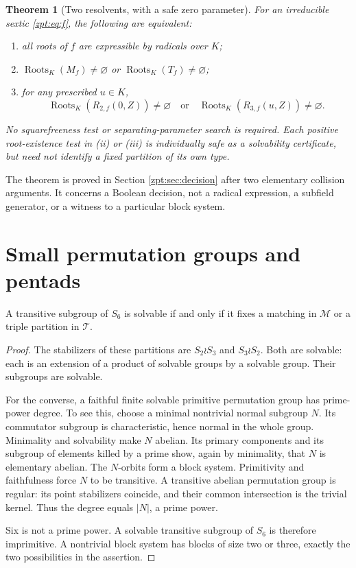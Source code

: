 \documentclass[11pt,letterpaper]{article}
\numberwithin{equation}{section}
\newtheorem{theorem}{Theorem}[section]
\theoremstyle{definition}
\theoremstyle{remark}
\newcommand{\Rtwo}{R_{2,f}}
\newcommand{\Rthree}{R_{3,f}}
\newcommand{\tpoM}{\mathcal M}
\newcommand{\tpoT}{\mathcal T}
\DeclareMathOperator{\Roots}{Roots}
\newcommand{\Ares}{M_f}\newcommand{\Tres}{T_f}
\newcommand{\roots}[1]{\Roots_K(#1)}
\begin{document}
\begin{theorem}[Two resolvents, with a safe zero parameter]
\label{zpt:thm:main}
For an irreducible sextic \eqref{zpt:eq:f}, the following are equivalent:
\begin{enumerate}[label=\textup{(\roman*)},itemsep=1pt]
\item all roots of $f$ are expressible by radicals over $K$;
\item $\roots{\Ares}\ne\varnothing$ or $\roots{\Tres}\ne\varnothing$;
\item for any prescribed $u\in K$,
\[
 \roots{\Rtwo(0,Z)}\ne\varnothing
 \quad\text{or}\quad
 \roots{\Rthree(u,Z)}\ne\varnothing.
\]
\end{enumerate}
No squarefreeness test or separating-parameter search is required.
Each positive root-existence test in (ii) or (iii) is individually safe as a
solvability certificate, but need not identify a fixed partition of its own
type.
\end{theorem}

The theorem is proved in Section \ref{zpt:sec:decision} after two elementary
collision arguments. It concerns a Boolean decision, not a radical
expression, a subfield generator, or a witness to a particular block system.

\section{Small permutation groups and pentads}
\label{zpt:sec:groups}
\begin{lemma}
\label{zpt:lem:block}
A transitive subgroup of $S_6$ is solvable if and only if it fixes a matching
in $\tpoM$ or a triple partition in $\tpoT$.
\end{lemma}
\begin{proof}
The stabilizers of these partitions are $S_2\wr S_3$ and $S_3\wr S_2$.
Both are solvable: each is an extension of a product of solvable groups by
a solvable group. Their subgroups are solvable.

For the converse, a faithful finite solvable primitive permutation group
has prime-power degree. To see this, choose a minimal nontrivial normal
subgroup $N$. Its commutator subgroup is characteristic, hence normal in
the whole group. Minimality and solvability make $N$ abelian. Its primary
components and its subgroup of elements killed by a prime show, again by
minimality, that $N$ is elementary abelian. The $N$-orbits form a block
system. Primitivity and faithfulness force $N$ to be transitive. A
transitive abelian permutation group is regular: its point stabilizers
coincide, and their common intersection is the trivial kernel. Thus the
degree equals $|N|$, a prime power.

Six is not a prime power. A solvable transitive subgroup of $S_6$ is
therefore imprimitive. A nontrivial block system has blocks of size two or
three, exactly the two possibilities in the assertion.
\end{proof}
\end{document}
